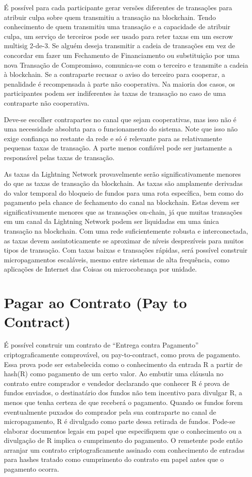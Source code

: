 \documentclass[letterpaper,11pt]{article}
\begin{document}
É possível para cada participante gerar versões diferentes de transações
para atribuir culpa sobre quem transmitiu a transação na blockchain. Tendo
conhecimento de quem transmitiu uma transação e a capacidade de atribuir
culpa, um serviço de terceiros pode ser usado para reter taxas em um
escrow multisig 2-de-3. Se alguém deseja transmitir a cadeia de transações
em vez de concordar em fazer um Fechamento de Financiamento ou
substituição por uma nova Transação de Compromisso, comunica-se com o
terceiro e transmite a cadeia à blockchain. Se a contraparte recusar o
aviso do terceiro para cooperar, a penalidade é recompensada à parte não
cooperativa. Na maioria dos casos, os participantes podem ser indiferentes
às taxas de transação no caso de uma contraparte não cooperativa.

Deve-se escolher contrapartes no canal que sejam cooperativas, mas isso
não é uma necessidade absoluta para o funcionamento do sistema. Note que
isso não exige confiança no restante da rede e só é relevante para as
relativamente pequenas taxas de transação. A parte menos confiável pode
ser justamente a responsável pelas taxas de transação.

As taxas da Lightning Network provavelmente serão significativamente
menores do que as taxas de transação da blockchain. As taxas são
amplamente derivadas do valor temporal do bloqueio de fundos para uma rota
específica, bem como do pagamento pela chance de fechamento do canal na
blockchain. Estas devem ser significativamente menores que as transações
on-chain, já que muitas transações em um canal da Lightning Network podem
ser liquidadas em uma única transação na blockchain. Com uma rede
suficientemente robusta e interconectada, as taxas devem
assintoticamente se aproximar de níveis desprezíveis para muitos tipos de
transação. Com taxas baixas e transações rápidas, será possível construir
micropagamentos escaláveis, mesmo entre sistemas de alta frequência, como
aplicações de Internet das Coisas ou microcobrança por unidade.

\section{Pagar ao Contrato (Pay to Contract)}

É possível construir um contrato de ``Entrega contra Pagamento''
criptograficamente comprovável, ou pay-to-contract\cite{paytocontract},
como prova de pagamento. Essa prova pode ser estabelecida como o
conhecimento da entrada R a partir de hash(R) como pagamento de um certo
valor. Ao embutir uma cláusula no contrato entre comprador e vendedor
declarando que conhecer R é prova de fundos enviados, o destinatário dos
fundos não tem incentivo para divulgar R, a menos que tenha certeza de que
receberá o pagamento. Quando os fundos forem eventualmente puxados do
comprador pela sua contraparte no canal de micropagamento, R é divulgado
como parte dessa retirada de fundos. Pode-se elaborar documentos legais
em papel que especifiquem que o conhecimento ou a divulgação de R implica
o cumprimento do pagamento. O remetente pode então arranjar um contrato
criptograficamente assinado com conhecimento de entradas para hashes
tratado como cumprimento do contrato em papel antes que o pagamento
ocorra.
\end{document}
